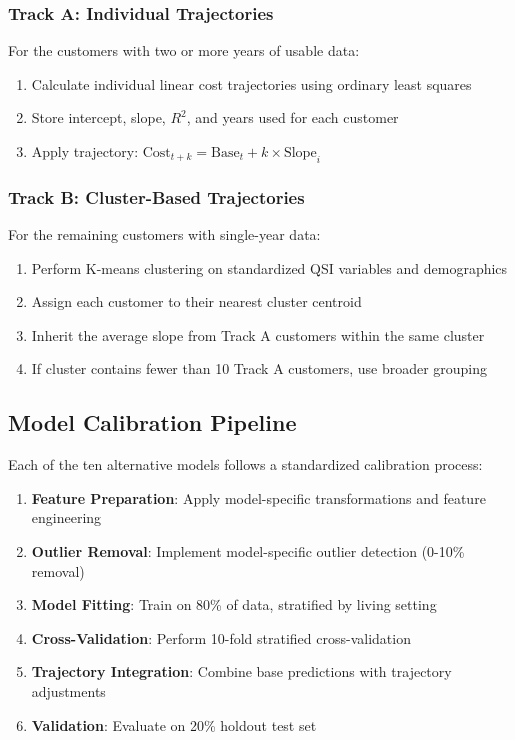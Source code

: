 \subsubsection{Track A: Individual Trajectories}
For the \CustomerNumberTwoPlusYear{} customers with two or more years of usable data:
\begin{enumerate}
    \item Calculate individual linear cost trajectories using ordinary least squares
    \item Store intercept, slope, $R^2$, and years used for each customer
    \item Apply trajectory: $\text{Cost}_{t+k} = \text{Base}_t + k \times \text{Slope}_i$
\end{enumerate}

\subsubsection{Track B: Cluster-Based Trajectories}
For the remaining customers with single-year data:
\begin{enumerate}
    \item Perform K-means clustering on standardized QSI variables and demographics
    \item Assign each customer to their nearest cluster centroid
    \item Inherit the average slope from Track A customers within the same cluster
    \item If cluster contains fewer than 10 Track A customers, use broader grouping
\end{enumerate}

\subsection{Model Calibration Pipeline}

Each of the ten alternative models follows a standardized calibration process:

\begin{enumerate}
    \item \textbf{Feature Preparation}: Apply model-specific transformations and feature engineering
    \item \textbf{Outlier Removal}: Implement model-specific outlier detection (0-10\% removal)
    \item \textbf{Model Fitting}: Train on 80\% of data, stratified by living setting
    \item \textbf{Cross-Validation}: Perform 10-fold stratified cross-validation
    \item \textbf{Trajectory Integration}: Combine base predictions with trajectory adjustments
    \item \textbf{Validation}: Evaluate on 20\% holdout test set
\end{enumerate}

